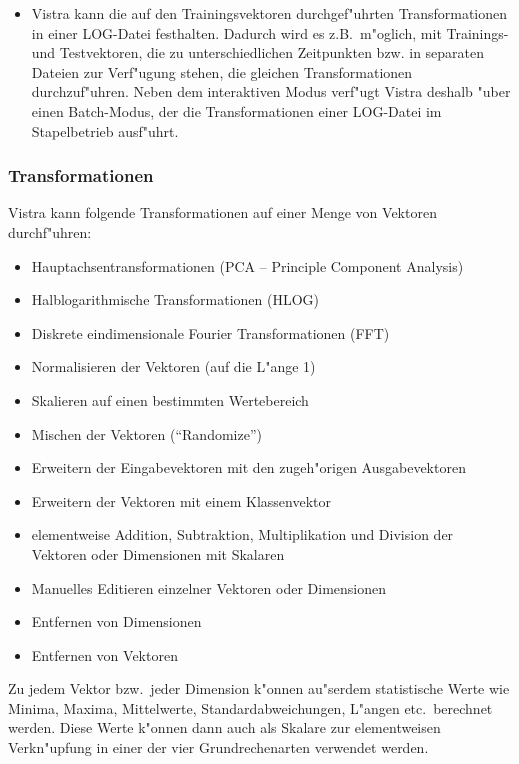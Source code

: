 \begin{itemize}
\item Vistra kann die auf den Trainingsvektoren durchgef"uhrten
Transformationen in einer LOG-Datei festhalten.
Dadurch wird es z.B.~m"oglich, mit Trainings- und Testvektoren, die zu
unterschiedlichen Zeitpunkten bzw. in separaten Dateien zur Verf"ugung stehen, 
die gleichen Transformationen durchzuf"uhren. 
Neben dem interaktiven Modus verf"ugt Vistra deshalb "uber einen Batch-Modus,
der die Transformationen einer LOG-Datei im Stapelbetrieb ausf"uhrt. 
\end{itemize}     

\subsubsection*{Transformationen}

Vistra kann folgende Transformationen auf einer Menge von
Vektoren durchf"uhren:

\begin{itemize}
\item Hauptachsentransformationen (PCA -- Principle Component Analysis)
\item Halblogarithmische Transformationen (HLOG) 
\item Diskrete eindimensionale Fourier Transformationen (FFT)
\item Normalisieren der Vektoren (auf die L"ange 1)
\item Skalieren auf einen bestimmten Wertebereich
\item Mischen der Vektoren ("`Randomize"')
\item Erweitern der Eingabevektoren mit den zugeh"origen Ausgabevektoren
\item Erweitern der Vektoren mit einem Klassenvektor
\item elementweise Addition, Subtraktion, Multiplikation und Division der
Vektoren oder Dimensionen mit Skalaren 
\item Manuelles Editieren einzelner Vektoren oder Dimensionen
\item Entfernen von Dimensionen
\item Entfernen von Vektoren
\end{itemize}

Zu jedem Vektor bzw.~jeder Dimension k"onnen au"serdem statistische
Werte wie Minima, Maxima, Mittelwerte, Standardabweichungen, L"angen
etc.~berechnet werden.   
Diese Werte k"onnen dann auch als Skalare zur elementweisen
Verkn"upfung in einer der vier Grundrechenarten verwendet werden.

